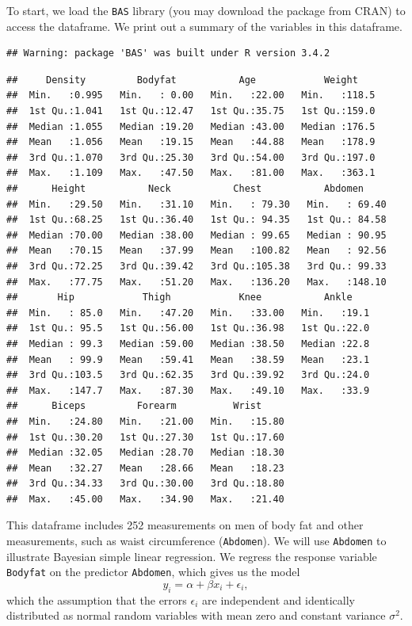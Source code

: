 \documentclass[]{book}
\theoremstyle{definition}
\theoremstyle{definition}
\theoremstyle{definition}
\theoremstyle{remark}
\begin{document}
To start, we load the \texttt{BAS} library (you may download the package
from CRAN) to access the dataframe. We print out a summary of the
variables in this dataframe.

\begin{verbatim}
## Warning: package 'BAS' was built under R version 3.4.2
\end{verbatim}

\begin{verbatim}
##     Density         Bodyfat           Age            Weight     
##  Min.   :0.995   Min.   : 0.00   Min.   :22.00   Min.   :118.5  
##  1st Qu.:1.041   1st Qu.:12.47   1st Qu.:35.75   1st Qu.:159.0  
##  Median :1.055   Median :19.20   Median :43.00   Median :176.5  
##  Mean   :1.056   Mean   :19.15   Mean   :44.88   Mean   :178.9  
##  3rd Qu.:1.070   3rd Qu.:25.30   3rd Qu.:54.00   3rd Qu.:197.0  
##  Max.   :1.109   Max.   :47.50   Max.   :81.00   Max.   :363.1  
##      Height           Neck           Chest           Abdomen      
##  Min.   :29.50   Min.   :31.10   Min.   : 79.30   Min.   : 69.40  
##  1st Qu.:68.25   1st Qu.:36.40   1st Qu.: 94.35   1st Qu.: 84.58  
##  Median :70.00   Median :38.00   Median : 99.65   Median : 90.95  
##  Mean   :70.15   Mean   :37.99   Mean   :100.82   Mean   : 92.56  
##  3rd Qu.:72.25   3rd Qu.:39.42   3rd Qu.:105.38   3rd Qu.: 99.33  
##  Max.   :77.75   Max.   :51.20   Max.   :136.20   Max.   :148.10  
##       Hip            Thigh            Knee           Ankle     
##  Min.   : 85.0   Min.   :47.20   Min.   :33.00   Min.   :19.1  
##  1st Qu.: 95.5   1st Qu.:56.00   1st Qu.:36.98   1st Qu.:22.0  
##  Median : 99.3   Median :59.00   Median :38.50   Median :22.8  
##  Mean   : 99.9   Mean   :59.41   Mean   :38.59   Mean   :23.1  
##  3rd Qu.:103.5   3rd Qu.:62.35   3rd Qu.:39.92   3rd Qu.:24.0  
##  Max.   :147.7   Max.   :87.30   Max.   :49.10   Max.   :33.9  
##      Biceps         Forearm          Wrist      
##  Min.   :24.80   Min.   :21.00   Min.   :15.80  
##  1st Qu.:30.20   1st Qu.:27.30   1st Qu.:17.60  
##  Median :32.05   Median :28.70   Median :18.30  
##  Mean   :32.27   Mean   :28.66   Mean   :18.23  
##  3rd Qu.:34.33   3rd Qu.:30.00   3rd Qu.:18.80  
##  Max.   :45.00   Max.   :34.90   Max.   :21.40
\end{verbatim}

This dataframe includes 252 measurements on men of body fat and other
measurements, such as waist circumference (\texttt{Abdomen}). We will
use \texttt{Abdomen} to illustrate Bayesian simple linear regression. We
regress the response variable \texttt{Bodyfat} on the predictor
\texttt{Abdomen}, which gives us the model
\[ y_i = \alpha + \beta x_i + \epsilon_i, \] which the assumption that
the errors \(\epsilon_i\) are independent and identically distributed as
normal random variables with mean zero and constant variance
\(\sigma^2\).
\end{document}
